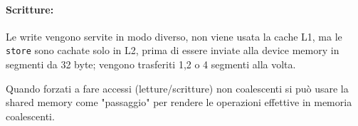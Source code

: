 \paragraph{Scritture:} Le write vengono servite in modo diverso, non viene usata la cache L1, ma le \texttt{store} sono cachate solo in L2, prima di essere inviate alla device memory in segmenti da 32 byte; vengono trasferiti 1,2 o 4 segmenti alla volta.

Quando forzati a fare accessi (letture/scritture) non coalescenti si può usare la shared memory come "passaggio" per rendere le operazioni effettive in memoria coalescenti.